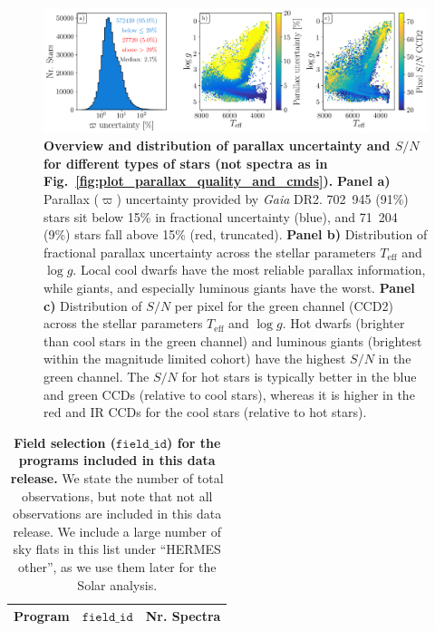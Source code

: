 \documentclass[fleqn,usenatbib,useAMS]{mnras}
\newcommand{\Teff}{$T_\mathrm{eff}$\xspace}
\newcommand{\logg}{$\log g$\xspace}
\newcommand{\Gaia}{\textit{Gaia}\xspace}
\begin{document}
\begin{figure}
\includegraphics[width=\textwidth]{figures/plot_distance_tefflogg_distance_snr.png}
  \caption{
\textbf{Overview and distribution of parallax uncertainty and $S/N$ for different types of stars (not spectra as in Fig.~\ref{fig:plot_parallax_quality_and_cmds}).}
\textbf{Panel a)} Parallax ($\varpi$) uncertainty provided by \Gaia DR2. 702~945 (91\%) stars sit below 15\% in fractional uncertainty (blue), and 71~204 (9\%) stars fall above 15\% (red, truncated). 
\textbf{Panel b)} Distribution of fractional parallax uncertainty across the stellar parameters \Teff and \logg. Local cool dwarfs have the most reliable parallax information, while giants, and especially luminous giants have the worst.
\textbf{Panel c)} Distribution of $S/N$ per pixel for the green channel (CCD2) across the stellar parameters \Teff and \logg. Hot dwarfs (brighter than cool stars in the green channel) and luminous giants (brightest within the magnitude limited cohort) have the highest $S/N$ in the green channel. The $S/N$ for hot stars is typically better in the blue and green CCDs (relative to cool stars), whereas it is higher in the red and IR CCDs for the cool stars (relative to hot stars).}
  \label{fig:distance}
\end{figure}

\begin{table}
\centering
 \caption{\textbf{Field selection ($\texttt{field\_id}$) for the programs included in this data release.} We state the number of total observations, but note that not all observations are included in this data release. We include a large number of sky flats in this list under ``HERMES other'', as we use them later for the Solar analysis.}
\label{tab:field_ids}
\begin{tabular}{ccc}
\hline \hline
Program & $\texttt{field\_id}$  & Nr. Spectra \\
\hline

  \hline
 \end{tabular}
\end{table}
\end{document}
